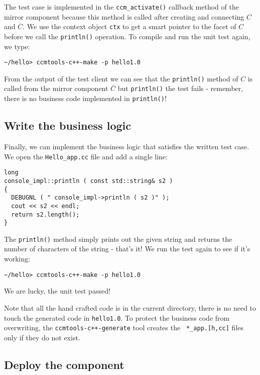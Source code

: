 \noindent
The test case is implemented in the {\tt ccm\_activate()} callback method of the
mirror component because this method is called after creating and connecting $C$
and $\overline{C}$. We use the context object {\tt ctx} to get a smart pointer
to the facet of $C$ before we call the {\tt println()} operation. To compile and
run the unit test again, we type:
\begin{verbatim}
~/hello> ccmtools-c++-make -p hello1.0
\end{verbatim}
From the output of the test client we can see that the {\tt println()} method of
$C$ is called from the mirror component $\overline{C}$ but {\tt println()} the
test fails - remember, there is no business code implemented in {\tt println()}!




\subsection{Write the business logic}

Finally, we can implement the business logic that satisfies the written test
case. We open the {\tt Hello\_app.cc} file and add a single line:
\begin{verbatim}
long
console_impl::println ( const std::string& s2 )
{
  DEBUGNL ( " console_impl->println ( s2 )" );
  cout << s2 << endl;
  return s2.length();
}
\end{verbatim}

\noindent
The {\tt println()} method simply prints out the given string and returns the
number of characters of the string - that's it! We run the test again to see if
it's working:
\begin{verbatim}
~/hello> ccmtools-c++-make -p hello1.0
\end{verbatim}

\noindent
We are lucky, the unit test passed!

\noindent
Note that all the hand crafted code is in the current directory, there is no
need to touch the generated code in {\tt hello1.0}. To protect the business code
from overwriting, the {\tt ccmtools-c++-generate} tool creates the {\tt
*\_app.[h,cc]} files only if they do not exist.


\subsection{Deploy the component}

